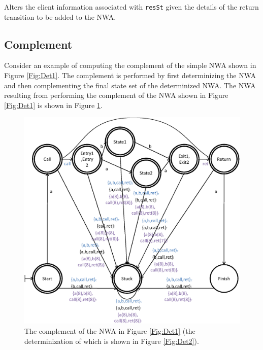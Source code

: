 \documentclass{llncs}
\begin{document}
\begin{description}
    Alters the client information associated with \texttt{resSt} given the details of the return transition to be added to the NWA. \\

\end{description}




\subsection{Complement}
\label{Se:Complement}

Consider an example of computing the complement of the simple NWA shown in Figure \ref{Fig:Det1}.  The complement is performed by first determinizing the NWA and then complementing the final state set of the determinized NWA.  The NWA resulting from performing the complement of the NWA shown in Figure \ref{Fig:Det1} is shown in Figure \ref{Fig:Comp1}.

\begin{figure}[htbp]
  \centering
    \includegraphics[width=12cm]{Figures/Figure20.eps}
  \caption{The complement of the NWA in Figure \ref{Fig:Det1} (the determinization of which is shown in Figure \ref{Fig:Det2}).}
  \label{Fig:Comp1}
\end{figure}
\end{document}
